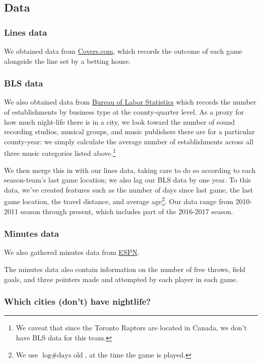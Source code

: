 \documentclass[letterpaper,12pt]{article}
\begin{document}
\subsection{Data}
\subsubsection{Lines data} We obtained data from \href{http://www.covers.com/sports/NBA/matchups?selectedDate=2011-1-01}{Covers.com}, which records the outcome of each game alongside the line set by a betting house.


\subsubsection{BLS data} We also obtained data from
\href{https://www.bls.gov/data/}{Bureau of Labor Statistics} which records the number of establishments by business type at the county-quarter level. As a 
proxy for how much night-life there is in a city, we look toward the 
number of sound recording studios, musical groups, and music publishers there 
are for a particular county-year: we simply calculate the average number of establishments across all three music categories listed above.\footnote{We caveat that since the Toronto Raptors are located in Canada, we don't have BLS data for this team.}

We then merge this in with our lines data, taking care to do so according to each season-team's last game location; we also lag our BLS data by one year.
To this data, we've created features such as 
the number of days since last game, the last game location, the travel distance, and
average age\footnote{We use $\log \textrm{\# days old}$, at the time the game is played.}. Our data range from 2010-2011 season through present, which includes part of the 2016-2017 season.

\subsubsection{Minutes data}
We also gathered minutes data from \href{http://www.espn.com/nba/scoreboard/_/date/}{ESPN}.

The minutes data also contain information on the number of free throws, field goals, and
three pointers made and attempted by each player in each game.

\subsubsection{Which cities (don't) have nightlife?}
\end{document}
